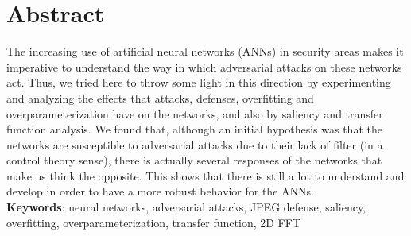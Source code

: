 \section*{Abstract}


The increasing use of artificial neural networks (ANNs) in security areas makes it imperative to understand the way in which adversarial attacks on these networks act. Thus, we tried here to throw some light in this direction by experimenting and analyzing the effects that attacks, defenses, overfitting and overparameterization have on the networks, and also by saliency and transfer function analysis. We found that, although an initial hypothesis was that the networks are susceptible to adversarial attacks due to their lack of filter (in a control theory sense), there is actually several responses of the networks that make us think the opposite. This shows that there is still a lot to understand and develop in order to have a more robust behavior for the ANNs. \\[1cm]

\noindent\textbf{Keywords}: neural networks, adversarial attacks, JPEG defense, saliency, overfitting, overparameterization, transfer function, 2D FFT